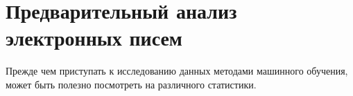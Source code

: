 \chapter{Предварительный анализ электронных писем}

Прежде чем приступать к исследованию данных методами машинного обучения, может быть полезно посмотреть на различного статистики.




\newpage
